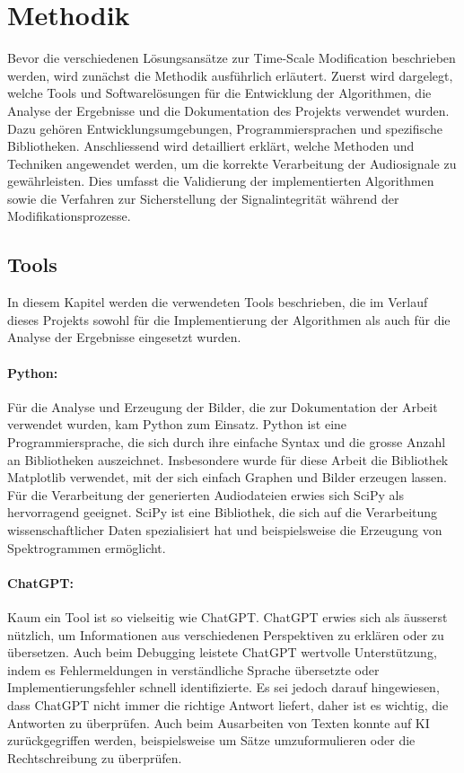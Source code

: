 \section{Methodik}
Bevor die verschiedenen Lösungsansätze zur Time-Scale Modification beschrieben werden, wird zunächst die Methodik ausführlich erläutert. Zuerst wird dargelegt, welche Tools und Softwarelösungen für die Entwicklung der Algorithmen, die Analyse der Ergebnisse und die Dokumentation des Projekts verwendet wurden. Dazu gehören Entwicklungsumgebungen, Programmiersprachen und spezifische Bibliotheken. Anschliessend wird detailliert erklärt, welche Methoden und Techniken angewendet werden, um die korrekte Verarbeitung der Audiosignale zu gewährleisten. Dies umfasst die Validierung der implementierten Algorithmen sowie die Verfahren zur Sicherstellung der Signalintegrität während der Modifikationsprozesse.

\subsection{Tools}
In diesem Kapitel werden die verwendeten Tools beschrieben, die im Verlauf dieses Projekts sowohl für die Implementierung der Algorithmen als auch für die Analyse der Ergebnisse eingesetzt wurden.

\paragraph{Python:}
Für die Analyse und Erzeugung der Bilder, die zur Dokumentation der Arbeit verwendet wurden, kam Python zum Einsatz. Python ist eine Programmiersprache, die sich durch ihre einfache Syntax und die grosse Anzahl an Bibliotheken auszeichnet. Insbesondere wurde für diese Arbeit die Bibliothek Matplotlib verwendet, mit der sich einfach Graphen und Bilder erzeugen lassen. Für die Verarbeitung der generierten Audiodateien erwies sich SciPy als hervorragend geeignet. SciPy ist eine Bibliothek, die sich auf die Verarbeitung wissenschaftlicher Daten spezialisiert hat und beispielsweise die Erzeugung von Spektrogrammen ermöglicht.

\paragraph{ChatGPT:}
Kaum ein Tool ist so vielseitig wie ChatGPT. ChatGPT erwies sich als äusserst nützlich, um Informationen aus verschiedenen Perspektiven zu erklären oder zu übersetzen. Auch beim Debugging leistete ChatGPT wertvolle Unterstützung, indem es Fehlermeldungen in verständliche Sprache übersetzte oder Implementierungsfehler schnell identifizierte. Es sei jedoch darauf hingewiesen, dass ChatGPT nicht immer die richtige Antwort liefert, daher ist es wichtig, die Antworten zu überprüfen. Auch beim Ausarbeiten von Texten konnte auf KI zurückgegriffen werden, beispielsweise um Sätze umzuformulieren oder die Rechtschreibung zu überprüfen.

